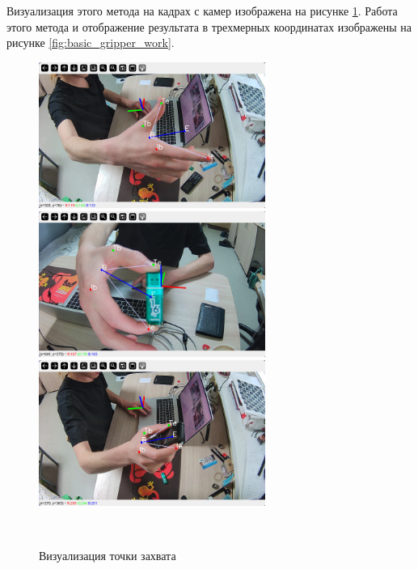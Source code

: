 \documentclass[12pt, a4paper]{article}
\begin{document}
Визуализация этого метода на кадрах с камер изображена на рисунке
\ref{fig:basic_gripping}. Работа этого метода и отображение результата в
трехмерных координатах изображены на рисунке \ref{fig:basic_gripper_work}.
\begin{figure}[h!]
    \centering
    \includegraphics[width=0.66\textwidth]{images/gripper-conversion/gripper-conversion-close-1.png}\\
    \includegraphics[width=0.66\textwidth]{images/gripper-conversion/gripper-conversion-close-2.png}\\
    \includegraphics[width=0.66\textwidth]{images/gripper-conversion/gripper-conversion-close-3.png}\\
    \caption{Визуализация точки захвата}
~\label{fig:basic_gripping}
\end{figure}
\end{document}
